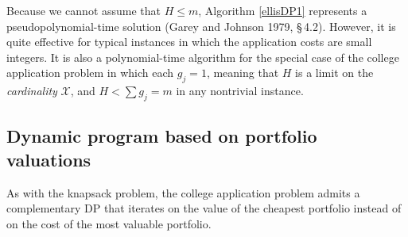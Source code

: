 Because we cannot assume that $H \leq m$, Algorithm \ref{ellisDP1} represents a pseudopolynomial-time solution (Garey and Johnson 1979, \S\,4.2). However, it is quite effective for typical instances in which the application costs are small integers. It is also a polynomial-time algorithm for the special case of the college application problem in which each $g_j = 1$, meaning that $H$ is a limit on the \emph{cardinality} $\mathcal{X}$, and $H < \sum g_j = m$ in any nontrivial instance. 

\subsection{Dynamic program based on portfolio valuations} \label{dpbasedonportfoliovaluations}

As with the knapsack problem, the college application problem admits a complementary DP that iterates on the value of the cheapest portfolio instead of on the cost of the most valuable portfolio.

